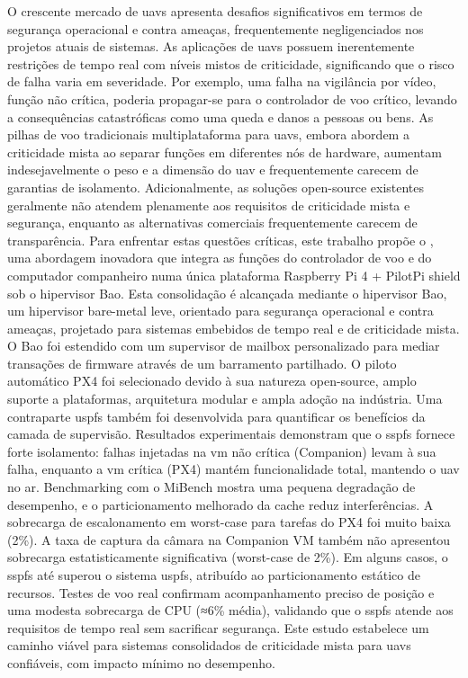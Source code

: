 
%

O crescente mercado de \glspl{uav} apresenta desafios significativos em termos de segurança operacional e contra ameaças, frequentemente negligenciados nos projetos atuais de sistemas. As aplicações de \glspl{uav} possuem inerentemente restrições de tempo real com níveis mistos de criticidade, significando que o risco de falha varia em severidade. Por exemplo, uma falha na vigilância por vídeo, função não crítica, poderia propagar-se para o controlador de voo crítico, levando a consequências catastróficas como uma queda e danos a pessoas ou bens. As pilhas de voo tradicionais multiplataforma para \glspl{uav}, embora abordem a criticidade mista ao separar funções em diferentes nós de hardware, aumentam indesejavelmente o peso e a dimensão do \gls{uav} e frequentemente carecem de garantias de isolamento. Adicionalmente, as soluções open-source existentes geralmente não atendem plenamente aos requisitos de criticidade mista e segurança, enquanto as alternativas comerciais frequentemente carecem de transparência.
%
Para enfrentar estas questões críticas, este trabalho propõe o , uma abordagem inovadora que integra as funções do controlador de voo e do computador companheiro numa única plataforma Raspberry Pi 4 + PilotPi shield sob o hipervisor Bao. Esta consolidação é alcançada mediante o hipervisor Bao, um hipervisor bare-metal leve, orientado para segurança operacional e contra ameaças, projetado para sistemas embebidos de tempo real e de criticidade mista. O Bao foi estendido com um supervisor de mailbox personalizado para mediar transações de firmware através de um barramento partilhado.
O piloto automático PX4 foi selecionado devido à sua natureza open-source, amplo suporte a plataformas, arquitetura modular e ampla adoção na indústria. Uma contraparte \gls{uspfs} também foi desenvolvida para quantificar os benefícios da camada de supervisão.
%
Resultados experimentais demonstram que o \gls{sspfs} fornece forte isolamento:
falhas injetadas na \gls{vm} não crítica (Companion) levam à sua falha, enquanto
a \gls{vm} crítica (PX4) mantém funcionalidade total, mantendo o \gls{uav} no
ar. Benchmarking com o MiBench mostra uma pequena degradação de desempenho, e o
particionamento melhorado da cache reduz interferências. A sobrecarga de
escalonamento em worst-case para tarefas do PX4 foi muito baixa (2\%). A taxa de
captura da câmara na Companion VM também não apresentou sobrecarga estatisticamente significativa (worst-case de 2\%). Em alguns casos, o \gls{sspfs} até superou o sistema \gls{uspfs}, atribuído ao particionamento estático de recursos. Testes de voo real confirmam acompanhamento preciso de posição e uma modesta sobrecarga de CPU (≈6\% média), validando que o \gls{sspfs} atende aos requisitos de tempo real sem sacrificar segurança. Este estudo estabelece um caminho viável para sistemas consolidados de criticidade mista para \glspl{uav} confiáveis, com impacto mínimo no desempenho.

